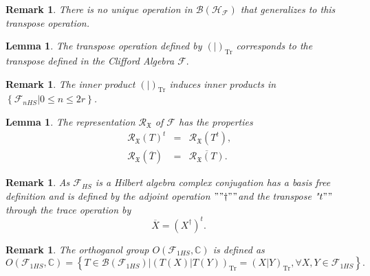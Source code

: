 \documentclass[aps, preprint]{revtex4}
\newtheorem{lemma}[theorem]{Lemma}
\newtheorem{remark}[theorem]{Remark}
\begin{document}
\begin{remark}
There is no unique operation in $\mathcal{B} \left (\mathcal{H}_{\mathcal{F}}\right )$ that generalizes to this transpose operation. 
\end{remark}


\begin{lemma}
The transpose operation defined by $\left (\left .\text{}\right \vert \right )_{\ensuremath{\operatorname*{Tr}}}$ corresponds to the transpose defined in the Clifford Algebra $\mathcal{F}\text{.}$ 
\end{lemma}


\begin{remark}
The inner product $\left (\left .\text{}\right \vert \right )_{\ensuremath{\operatorname*{Tr}}}$ induces inner products in $\left \{\left .\mathcal{F}_{n H S}\right \vert 0 \leq n \leq 2 r\right \}$. 
\end{remark}


\begin{lemma}
The representation $\mathcal{R}_{\mathfrak{X}}$ of $\mathcal{F}$ has the properties
\begin{align}\mathcal{R}_{\mathfrak{X}} \left (T\right )^{t} &  = & \mathcal{R}_{\mathfrak{X}} \left (T^{t}\right )\text{,} \\
\mathcal{R}_{\mathfrak{X}} \left (\overline{T}\right ) &  = & \overline{\mathcal{R}_{\mathfrak{X}} \left (T\right )}\text{.}\end{align}
\end{lemma}


\begin{remark}
As $\mathcal{F}_{H S}$ is a \emph{Hilbert algebra} \emph{complex conjugation has a basis free definition} and is defined
by the adjoint operation $"" \dag ""$and the transpose "$t ""$ through the trace operation by
\begin{equation}\overline{X} =\left (X^{ \dag }\right )^{t}\text{.}
\end{equation}
\end{remark}


\begin{remark}
The orthoganol group $O \left (\mathcal{F}_{1 H S} ,\mathbb{C}\right )$ is defined as
\begin{equation}O \left (\mathcal{F}_{1 H S} ,\mathbb{C}\right ) =\left \{\left .T \in \mathcal{B} \left (\mathcal{F}_{1 H S}\right )\right \vert \left (\left .T \left (X\right )\right \vert T \left (Y\right )\right )_{\ensuremath{\operatorname*{Tr}}} =\left (\left .X\right \vert Y\right )_{\ensuremath{\operatorname*{Tr}}} , \forall X ,Y \in \mathcal{F}_{1 H S}\right \}\text{.}
\end{equation}
\end{remark}
\end{document}
